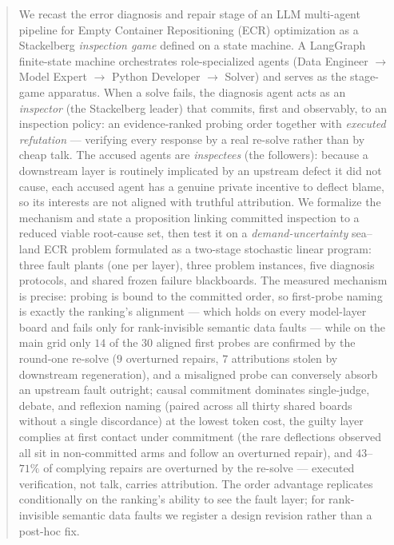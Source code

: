 \documentclass[a4paper,fleqn]{cas-sc}
\begin{document}
\begin{abstract}
We recast the error diagnosis and repair stage of an LLM multi-agent
pipeline for Empty Container Repositioning (ECR) optimization as a Stackelberg
\emph{inspection game} defined on a state machine. A LangGraph finite-state machine orchestrates role-specialized
agents (Data Engineer $\to$ Model Expert $\to$ Python Developer $\to$ Solver)
and serves as the stage-game apparatus. When a solve fails, the diagnosis
agent acts as an \emph{inspector} (the Stackelberg leader) that commits, first
and observably, to an inspection policy: an evidence-ranked probing order
together with \emph{executed refutation} --- verifying every response by a
real re-solve rather than by cheap talk. The accused agents are
\emph{inspectees} (the followers): because a downstream layer is routinely
implicated by an upstream defect it did not cause, each accused agent has a
genuine private incentive to deflect blame, so its interests are not aligned
with truthful attribution. We formalize the mechanism and state a proposition
linking committed inspection to a reduced viable root-cause set, then test it
on a \emph{demand-uncertainty} sea--land ECR problem formulated as a two-stage
stochastic linear program: three fault plants (one per layer), three problem
instances, five diagnosis protocols, and shared frozen failure blackboards.
The measured mechanism is precise: probing is bound to the committed
order, so first-probe naming is exactly the ranking's alignment --- which
holds on every model-layer board and fails only for rank-invisible
semantic data faults --- while on the main grid only $14$ of the $30$
aligned first probes are confirmed by the round-one re-solve ($9$
overturned repairs, $7$ attributions stolen by downstream regeneration),
and a misaligned probe can conversely absorb an upstream fault outright;
causal commitment dominates single-judge, debate, and
reflexion naming (paired across all thirty shared boards without a single
discordance) at the lowest token cost, the
guilty layer complies at first contact under commitment (the rare
deflections observed all sit in non-committed arms and follow an
overturned repair), and $43$--$71\%$ of complying
repairs are overturned by the re-solve --- executed verification, not talk,
carries attribution. The order advantage replicates conditionally on the
ranking's ability to see the fault layer; for rank-invisible semantic data
faults we register a design revision rather than a post-hoc fix.
\end{abstract}
\end{document}
